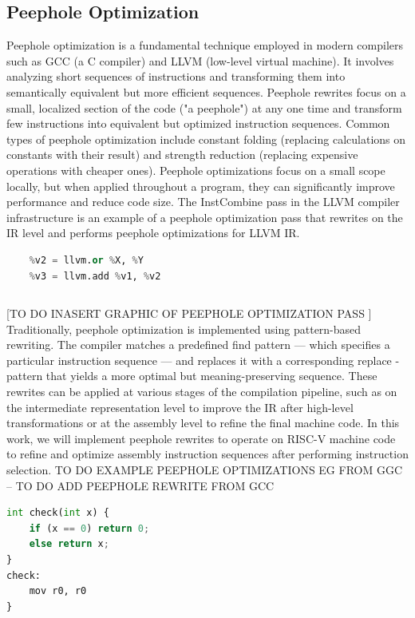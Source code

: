 \subsection{Peephole Optimization} 
 Peephole optimization is a fundamental technique employed in modern compilers such as GCC (a C compiler) and LLVM (low-level virtual machine). It involves analyzing short sequences of instructions and transforming them into semantically equivalent but more efficient sequences.  Peephole rewrites focus on a small, localized section of the code ("a peephole") at any one time and transform few instructions into equivalent but optimized instruction sequences.  Common types of peephole optimization include constant folding (replacing calculations on constants with their result) and strength reduction (replacing expensive operations with cheaper ones). Peephole optimizations focus on a small scope locally, but when applied throughout a program, they can significantly improve performance and reduce code size. The InstCombine pass in the LLVM compiler infrastructure is an example of a peephole optimization pass that rewrites on the IR level and performs peephole optimizations for LLVM IR.
 \begin{lstlisting}[language=Python, caption=unoptimized IR instruction sequence]
    %v1 = llvm.and %X, %Y
    %v2 = llvm.or %X, %Y
    %v3 = llvm.add %v1, %v2
\end{lstlisting}
 \begin{lstlisting}[language=Python, caption= peephole optimized IR instruction sequence ]
 %v3 = llvm.add %X, %Y
\end{lstlisting}
 [TO DO INASERT GRAPHIC OF PEEPHOLE OPTIMIZATION PASS ]
 Traditionally, peephole optimization is implemented using pattern-based rewriting. The compiler matches a predefined find pattern — which specifies a particular instruction sequence — and replaces it with a corresponding replace - pattern that yields a more optimal but meaning-preserving sequence. These rewrites can be applied at various stages of the compilation pipeline, such as on the intermediate representation level to improve the IR after high-level transformations or at the assembly level to refine the final machine code. In this work, we will implement peephole rewrites to operate on RISC-V machine code to refine and optimize assembly instruction sequences after performing instruction selection.
TO DO EXAMPLE PEEPHOLE OPTIMIZATIONS EG FROM GGC 
-- TO DO ADD PEEPHOLE REWRITE FROM GCC  
\begin{lstlisting}[language=Python, caption=unoptimized]
int check(int x) {						        
	if (x == 0) return 0; 					
    else return x;
}
check: 
    mov r0, r0
}

\end{lstlisting}
